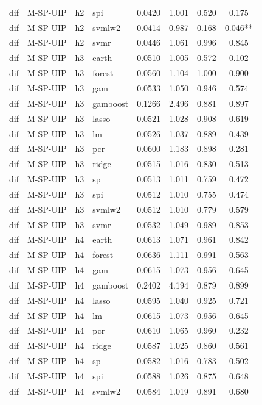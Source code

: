 \begin{ThreePartTable}
\begin{longtable}[t]{llclcccc}
dif & M-SP-UIP & h2 & spi & 0.0420 & 1.001 & 0.520 & 0.175\\
dif & M-SP-UIP & h2 & svmlw2 & 0.0414 & 0.987 & 0.168 & 0.046**\\
dif & M-SP-UIP & h2 & svmr & 0.0446 & 1.061 & 0.996 & 0.845\\
\addlinespace
dif & M-SP-UIP & h3 & earth & 0.0510 & 1.005 & 0.572 & 0.102\\
dif & M-SP-UIP & h3 & forest & 0.0560 & 1.104 & 1.000 & 0.900\\
dif & M-SP-UIP & h3 & gam & 0.0533 & 1.050 & 0.946 & 0.574\\
dif & M-SP-UIP & h3 & gamboost & 0.1266 & 2.496 & 0.881 & 0.897\\
dif & M-SP-UIP & h3 & lasso & 0.0521 & 1.028 & 0.908 & 0.619\\
dif & M-SP-UIP & h3 & lm & 0.0526 & 1.037 & 0.889 & 0.439\\
dif & M-SP-UIP & h3 & pcr & 0.0600 & 1.183 & 0.898 & 0.281\\
dif & M-SP-UIP & h3 & ridge & 0.0515 & 1.016 & 0.830 & 0.513\\
dif & M-SP-UIP & h3 & sp & 0.0513 & 1.011 & 0.759 & 0.472\\
dif & M-SP-UIP & h3 & spi & 0.0512 & 1.010 & 0.755 & 0.474\\
dif & M-SP-UIP & h3 & svmlw2 & 0.0512 & 1.010 & 0.779 & 0.579\\
dif & M-SP-UIP & h3 & svmr & 0.0532 & 1.049 & 0.989 & 0.853\\
\addlinespace
dif & M-SP-UIP & h4 & earth & 0.0613 & 1.071 & 0.961 & 0.842\\
dif & M-SP-UIP & h4 & forest & 0.0636 & 1.111 & 0.991 & 0.563\\
dif & M-SP-UIP & h4 & gam & 0.0615 & 1.073 & 0.956 & 0.645\\
dif & M-SP-UIP & h4 & gamboost & 0.2402 & 4.194 & 0.879 & 0.899\\
dif & M-SP-UIP & h4 & lasso & 0.0595 & 1.040 & 0.925 & 0.721\\
dif & M-SP-UIP & h4 & lm & 0.0615 & 1.073 & 0.956 & 0.645\\
dif & M-SP-UIP & h4 & pcr & 0.0610 & 1.065 & 0.960 & 0.232\\
dif & M-SP-UIP & h4 & ridge & 0.0587 & 1.025 & 0.860 & 0.561\\
dif & M-SP-UIP & h4 & sp & 0.0582 & 1.016 & 0.783 & 0.502\\
dif & M-SP-UIP & h4 & spi & 0.0588 & 1.026 & 0.875 & 0.648\\
dif & M-SP-UIP & h4 & svmlw2 & 0.0584 & 1.019 & 0.891 & 0.680\\

\end{longtable}
\end{ThreePartTable}
